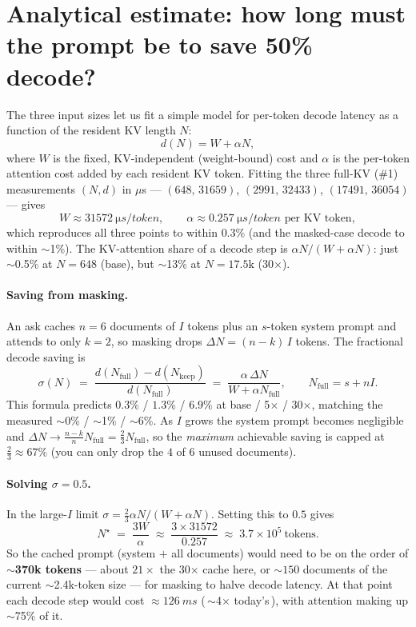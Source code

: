 \documentclass[11pt]{article}
\begin{document}
\section{Analytical estimate: how long must the prompt be to save 50\% decode?}

The three input sizes let us fit a simple model for per-token decode latency as a
function of the resident KV length $N$:
\begin{equation}
  d(N) = W + \alpha N,
\end{equation}
where $W$ is the fixed, KV-independent (weight-bound) cost and $\alpha$ is the
per-token attention cost added by each resident KV token. Fitting the three
full-KV (\#1) measurements $(N, d)$ in $\mu$s --- $(648,\,31659)$,
$(2991,\,32433)$, $(17491,\,36054)$ --- gives
\begin{equation}
  W \approx \SI{31572}{\micro s/token}, \qquad
  \alpha \approx \SI{0.257}{\micro s/token} \text{ per KV token},
\end{equation}
which reproduces all three points to within $0.3\%$ (and the masked-case decode
to within $\sim$1\%). The KV-attention share of a decode step is
$\alpha N/(W+\alpha N)$: just $\sim$0.5\% at $N{=}648$ (base), but $\sim$13\% at
$N{=}17.5\mathrm{k}$ (30$\times$).

\paragraph{Saving from masking.} An ask caches $n{=}6$ documents of $I$ tokens
plus an $s$-token system prompt and attends to only $k{=}2$, so masking drops
$\Delta N=(n-k)\,I$ tokens. The fractional decode saving is
\begin{equation}
  \sigma(N) \;=\; \frac{d(N_{\text{full}})-d(N_{\text{keep}})}{d(N_{\text{full}})}
  \;=\; \frac{\alpha\,\Delta N}{W+\alpha N_{\text{full}}},
  \qquad N_{\text{full}}=s+nI .
\end{equation}
This formula predicts $0.3\%$ / $1.3\%$ / $6.9\%$ at base / 5$\times$ / 30$\times$,
matching the measured $\sim$0\% / $\sim$1\% / $\sim$6\%. As $I$ grows the system
prompt becomes negligible and $\Delta N\to\tfrac{n-k}{n}N_{\text{full}}=\tfrac23
N_{\text{full}}$, so the \emph{maximum} achievable saving is capped at
$\tfrac23\approx 67\%$ (you can only drop the $4$ of $6$ unused documents).

\paragraph{Solving $\sigma=0.5$.} In the large-$I$ limit
$\sigma=\tfrac23\alpha N/(W+\alpha N)$. Setting this to $0.5$ gives
\begin{equation}
  N^\star \;=\; \frac{3W}{\alpha}\;\approx\;\frac{3\times 31572}{0.257}
  \;\approx\; 3.7\times 10^{5}\ \text{tokens}.
\end{equation}
So the cached prompt (system $+$ all documents) would need to be on the order of
\textbf{$\sim$370k tokens} --- about $21\times$ the 30$\times$ cache here, or
$\sim$$150$ documents of the current $\sim$2.4k-token size --- for masking to halve
decode latency. At that point each decode step would cost $\approx\SI{126}{ms}$
(\,$\sim$4$\times$ today's\,), with attention making up $\sim$75\% of it.
\end{document}
